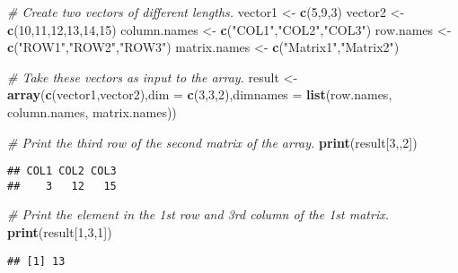 \documentclass[
]{article}
\newenvironment{Shaded}{\begin{snugshade}}{\end{snugshade}}
\newcommand{\AttributeTok}[1]{\textcolor[rgb]{0.13,0.29,0.53}{#1}}
\newcommand{\CommentTok}[1]{\textcolor[rgb]{0.56,0.35,0.01}{\textit{#1}}}
\newcommand{\DecValTok}[1]{\textcolor[rgb]{0.00,0.00,0.81}{#1}}
\newcommand{\FunctionTok}[1]{\textcolor[rgb]{0.13,0.29,0.53}{\textbf{#1}}}
\newcommand{\NormalTok}[1]{#1}
\newcommand{\OtherTok}[1]{\textcolor[rgb]{0.56,0.35,0.01}{#1}}
\newcommand{\StringTok}[1]{\textcolor[rgb]{0.31,0.60,0.02}{#1}}
\begin{document}
\begin{Shaded}
\begin{Highlighting}[]
\CommentTok{\# Create two vectors of different lengths.}
\NormalTok{vector1 }\OtherTok{\textless{}{-}} \FunctionTok{c}\NormalTok{(}\DecValTok{5}\NormalTok{,}\DecValTok{9}\NormalTok{,}\DecValTok{3}\NormalTok{)}
\NormalTok{vector2 }\OtherTok{\textless{}{-}} \FunctionTok{c}\NormalTok{(}\DecValTok{10}\NormalTok{,}\DecValTok{11}\NormalTok{,}\DecValTok{12}\NormalTok{,}\DecValTok{13}\NormalTok{,}\DecValTok{14}\NormalTok{,}\DecValTok{15}\NormalTok{)}
\NormalTok{column.names }\OtherTok{\textless{}{-}} \FunctionTok{c}\NormalTok{(}\StringTok{"COL1"}\NormalTok{,}\StringTok{"COL2"}\NormalTok{,}\StringTok{"COL3"}\NormalTok{)}
\NormalTok{row.names }\OtherTok{\textless{}{-}} \FunctionTok{c}\NormalTok{(}\StringTok{"ROW1"}\NormalTok{,}\StringTok{"ROW2"}\NormalTok{,}\StringTok{"ROW3"}\NormalTok{)}
\NormalTok{matrix.names }\OtherTok{\textless{}{-}} \FunctionTok{c}\NormalTok{(}\StringTok{"Matrix1"}\NormalTok{,}\StringTok{"Matrix2"}\NormalTok{)}

\CommentTok{\# Take these vectors as input to the array.}
\NormalTok{result }\OtherTok{\textless{}{-}} \FunctionTok{array}\NormalTok{(}\FunctionTok{c}\NormalTok{(vector1,vector2),}\AttributeTok{dim =} \FunctionTok{c}\NormalTok{(}\DecValTok{3}\NormalTok{,}\DecValTok{3}\NormalTok{,}\DecValTok{2}\NormalTok{),}\AttributeTok{dimnames =} \FunctionTok{list}\NormalTok{(row.names,}
\NormalTok{   column.names, matrix.names))}

\CommentTok{\# Print the third row of the second matrix of the array.}
\FunctionTok{print}\NormalTok{(result[}\DecValTok{3}\NormalTok{,,}\DecValTok{2}\NormalTok{])}
\end{Highlighting}
\end{Shaded}

\begin{verbatim}
## COL1 COL2 COL3 
##    3   12   15
\end{verbatim}

\begin{Shaded}
\begin{Highlighting}[]
\CommentTok{\# Print the element in the 1st row and 3rd column of the 1st matrix.}
\FunctionTok{print}\NormalTok{(result[}\DecValTok{1}\NormalTok{,}\DecValTok{3}\NormalTok{,}\DecValTok{1}\NormalTok{])}
\end{Highlighting}
\end{Shaded}

\begin{verbatim}
## [1] 13
\end{verbatim}
\end{document}
